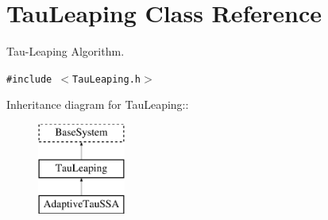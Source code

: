 \hypertarget{class_tau_leaping}{
\section{TauLeaping Class Reference}
\label{class_tau_leaping}
}
Tau-Leaping Algorithm.  


{\tt \#include $<$TauLeaping.h$>$}

Inheritance diagram for TauLeaping::\begin{figure}[H]
\begin{center}
\leavevmode
\includegraphics[height=3cm]{class_tau_leaping}
\end{center}
\end{figure}
